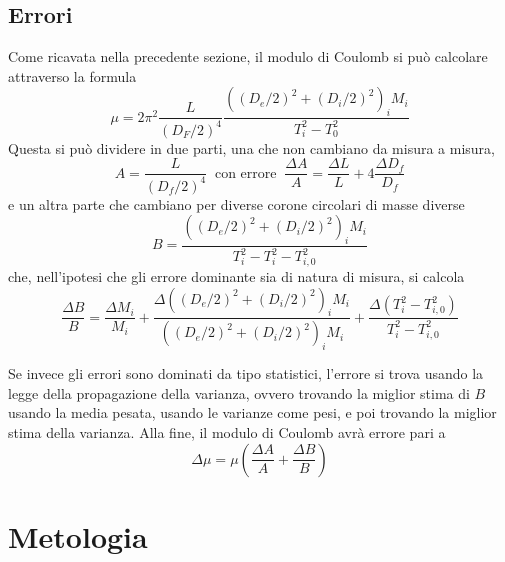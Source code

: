 \documentclass[a4paper]{article}
\begin{document}
\subsection{Errori}
Come ricavata nella precedente sezione, il modulo di Coulomb si può calcolare attraverso la formula
\begin{equation}
    \mu = 2\pi^2 \frac{L}{(D_F/2)^4} \frac{((D_e/2)^2 + (D_i/2)^2)_i M_i}{T^2_i-T^2_0}
\end{equation}
Questa si può dividere in due parti, una che non cambiano da misura a misura, 
\begin{equation}
    A = \frac{L}{(D_f/2)^4} \; \; \text{con errore} \; \; \frac{\Delta A}{A} = \frac{\Delta L}{L} + 4\frac{\Delta D_f}{D_f}
\end{equation}
e un altra parte che cambiano per diverse corone circolari di masse diverse
\begin{equation}
    B = \frac{((D_e/2)^2+(D_i/2)^2)_i M_i}{T^2_i - T^2_i-T^2_{i,0}} 
\end{equation}
che, nell'ipotesi che gli errore dominante sia di natura di misura, si calcola
\begin{equation}
    \frac{\Delta B}{B} = \frac{\Delta M_i}{M_i} + \frac{\Delta ((D_e/2)^2+(D_i/2)^2)_i M_i}{((D_e/2)^2+(D_i/2)^2)_i M_i} + \frac{\Delta (T^2_i-T^2_{i,0})}{T^2_i-T^2_{i,0}}
\end{equation}

Se invece gli errori sono dominati da tipo statistici, l'errore si trova usando la legge della propagazione della varianza, ovvero trovando la miglior stima di $B$ usando la media pesata, usando le varianze come pesi, e poi trovando la miglior stima della varianza. 
Alla fine, il modulo di Coulomb avrà errore pari a 
\begin{equation}
    \Delta \mu = \mu (\frac{\Delta A}{A} + \frac{\Delta B}{B})
\end{equation}

\section{Metologia}
\end{document}
